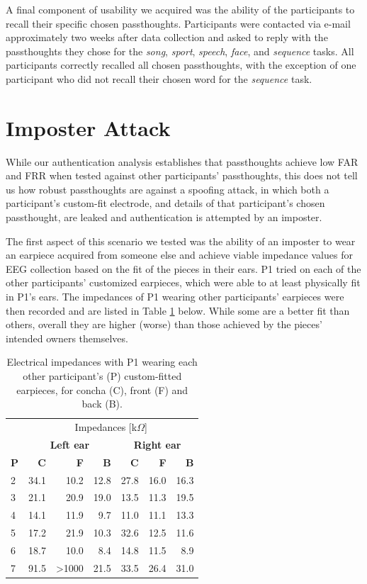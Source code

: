 \documentclass{sigchi}
\begin{document}
A final component of usability we acquired was the ability of the participants to recall their specific chosen passthoughts. Participants were contacted via e-mail approximately two weeks after data collection and asked to reply with the passthoughts they chose for the \textit{song}, \textit{sport}, \textit{speech}, \textit{face}, and \textit{sequence} tasks. All participants correctly recalled all chosen passthoughts, with the exception of one participant who did not recall their chosen word for the \textit{sequence} task. 

\section{Imposter Attack}

While our authentication analysis establishes that passthoughts achieve low FAR and FRR when tested against other participants' passthoughts, this does not tell us how robust passthoughts are against a spoofing attack, in which both a participant's custom-fit electrode, and details of that participant's chosen passthought, are leaked and authentication is attempted by an imposter. 

The first aspect of this scenario we tested was the ability of an imposter to wear an earpiece acquired from someone else and achieve viable impedance values for EEG collection based on the fit of the pieces in their ears. P1 tried on each of the other participants' customized earpieces, which were able to at least physically fit in P1's ears. The impedances of P1 wearing other participants' earpieces were then recorded and are listed in Table \ref{tab:imposter_impedances} below. While some are a better fit than others, overall they are higher (worse) than those achieved by the pieces' intended owners themselves.

\begin{table}[h]
\begin{center}
\begin{tabular}{lrrrrrr}
& \multicolumn{6}{c}{Impedances [k\(\Omega\)]} \\
\cline{2-7}
& \multicolumn{3}{|c|}{\textbf{Left ear}} & \multicolumn{3}{c|}{\textbf{Right ear}} \\
\textbf{P} & \textbf{C} & \textbf{F} & \textbf{B} & \textbf{C} & \textbf{F} & \textbf{B} \\
\hline
2 & 34.1 & 10.2 & 12.8 & 27.8 & 16.0 & 16.3\\
3 & 21.1 & 20.9 & 19.0 & 13.5 & 11.3 & 19.5\\
4 & 14.1 & 11.9 & 9.7 & 11.0 & 11.1 & 13.3\\
5 & 17.2 & 21.9 & 10.3 & 32.6 & 12.5 & 11.6\\
6 & 18.7 & 10.0 & 8.4 & 14.8 & 11.5 & 8.9\\
7 & 91.5 & \textgreater1000 & 21.5 & 33.5 & 26.4 & 31.0\\
\end{tabular}
\end{center}
\caption{Electrical impedances with P1 wearing each other participant's (P) custom-fitted earpieces, for concha (C), front (F) and back (B).}
\label{tab:imposter_impedances}
\end{table}
\end{document}
